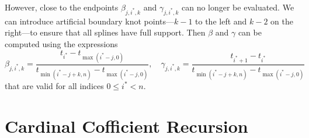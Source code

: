 However, close to the endpoints $\beta_{j, i^*, k}$ and $\gamma_{j, i^*, k}$ can no longer be evaluated. We can introduce artificial boundary knot points---$k-1$ to the left and $k-2$ on the right---to ensure that all splines have full support. Then $\beta$ and $\gamma$ can be computed using the expressions
\begin{equation}
  \label{eq:beta_capped}
  \beta_{j, i^*, k} = \frac{t_{i^*} - t_{\max(i^* - j, 0)}}{t_{\min(i^* - j + k, n)} - t_{\max(i^* - j, 0)}}, \quad \gamma_{j, i^*, k} = \frac{t_{i^*+1} - t_{i^*}}{t_{\min(i^* - j + k, n)} - t_{\max(i^* - j, 0)}}
\end{equation}
that are valid for all indices $0 \leq i^* < n$.


\section{Cardinal Cofficient Recursion}

